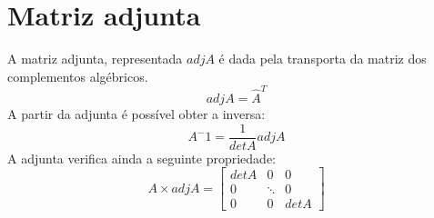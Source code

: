 \documentclass[]{report}
\begin{document}
\section{Matriz adjunta}
A matriz adjunta, representada $adj A$ é dada pela transporta da matriz dos complementos algébricos.
$$adj A = \hat A^T$$
A partir da adjunta é possível obter a inversa:
$$A^-1 = \frac{1}{det A} adj A$$
A adjunta verifica ainda a seguinte propriedade:
$$
A \times adj A =
\begin{bmatrix}
det A & 0 & 0\\
0 & \ddots & 0\\
0 & 0 & det A
\end{bmatrix}
$$
\end{document}
